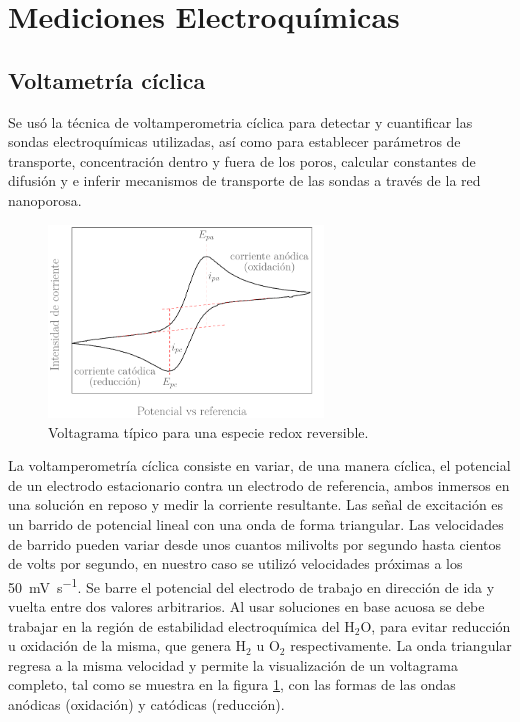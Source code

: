 \section{Mediciones Electroquímicas}\label{sec:medidas_eq}
	
	 \subsection{Voltametría cíclica}
	 		Se usó la técnica de voltamperometria cíclica para detectar y cuantificar las sondas electroquímicas utilizadas, así como para establecer parámetros de transporte, concentración dentro y fuera de los poros, calcular constantes de difusión y e inferir mecanismos de transporte de las sondas a través de la red nanoporosa.\cite{Wi2000,Skoog1995,Gewirth2004} 


			\begin{figure}[ht]
			 		  \begin{center}
			 		  \includegraphics[width=0.65\textwidth]{Esquemas/CV_ideal.pdf}
			 		  \caption[Voltamperograma ideal]{Voltagrama típico para una especie redox reversible.}
			 		  \label{fig:CV_ideal}
			 		  \end{center}
			 		  \end{figure}

	 		La voltamperometría cíclica consiste en variar, de una manera cíclica, el potencial de un electrodo estacionario contra un electrodo de referencia, ambos inmersos en una solución en reposo y medir la corriente resultante. Las señal de excitación es un barrido de potencial lineal con una onda de forma triangular. Las velocidades de barrido pueden variar desde unos cuantos milivolts por segundo hasta cientos de volts por segundo, en nuestro caso se utilizó velocidades próximas a los \SI{50}{\milli\volt.\second^{-1}}. Se barre el potencial del electrodo de trabajo en dirección de ida y vuelta entre dos valores arbitrarios. Al usar soluciones en base acuosa se debe trabajar en la región de estabilidad electroquímica del H$_2$O, para evitar reducción u oxidación de la misma, que genera H$_2$ u O$_2$ respectivamente. La onda triangular regresa a la misma velocidad y permite la visualización de un voltagrama completo, tal como se muestra en la figura \ref{fig:CV_ideal}, con las formas de las ondas anódicas (oxidación) y catódicas (reducción). 

